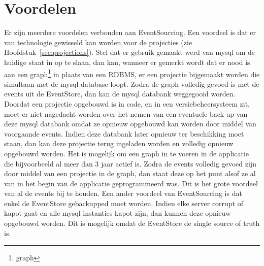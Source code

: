 
\chapter{Voordelen}
\label{ch:voordelen}

Er zijn meerdere voordelen verbonden aan EventSourcing. Een voordeel is dat er van technologie gewisseld kan worden voor de projecties (zie Hoofdstuk~\ref{sec:projections}). Stel dat er gebruik gemaakt werd van \gls{mysql} om de huidige staat in op te slaan, dan kan, wanneer er gemerkt wordt dat er nood is aan een \gls{graph}\footnote{\glsdesc{graph}} in plaats van een \glsdesc{RDBMS}, er een projectie bijgemaakt worden die simultaan met de \gls{mysql} database loopt. Zodra de \gls{graph} volledig gevoed is met de events uit de EventStore, dan kan de \gls{mysql} databank weggegooid worden. Doordat een projectie opgebouwd is in code, en in een versiebeheersysteem zit, moet er niet nagedacht worden over het nemen van een eventuele back-up van deze \gls{mysql} databank omdat ze opnieuw opgebouwd kan worden door middel van voorgaande events. Indien deze databank later opnieuw ter beschikking moet staan, dan kan deze projectie terug ingeladen worden en volledig opnieuw opgebouwd worden.
Het is mogelijk om een \gls{graph} in te voeren in de applicatie die bijvoorbeeld al meer dan 3 jaar actief is. Zodra de events volledig gevoed zijn door middel van een projectie in de \gls{graph}, dan staat deze op het punt alsof ze al van in het begin van de applicatie geprogrammeerd was. Dit is het grote voordeel van al de events bij te houden.
Een ander voordeel van EventSourcing is dat enkel de EventStore gebackupped moet worden. Indien elke server corrupt of kapot gaat en alle \gls{mysql} instanties kapot zijn, dan kunnen deze opnieuw opgebouwd worden. Dit is mogelijk omdat de EventStore de single source of truth is.